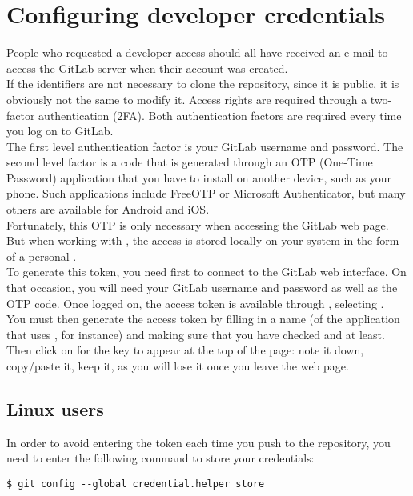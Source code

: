 \section{Configuring developer credentials}
People who requested a developer access should all have received an e-mail to
access the GitLab server when their account was created.\\

If the identifiers are not necessary to clone the repository, since it is
public, it is obviously not the same to modify it. Access rights are required
through a two-factor authentication (2FA). Both authentication factors are
required every time you log on to GitLab.\\

The first level authentication factor is your GitLab username and password. The
second level factor is a code that is generated through an OTP (One-Time
Password) application that you have to install on another device, such as your
phone. Such applications include FreeOTP or Microsoft Authenticator, but many
others are available for Android and iOS.\\

Fortunately, this OTP is only necessary when accessing the GitLab web page. But
when working with , the access is stored locally on your system in
the form of a personal .\\

To generate this token, you need first to connect to the GitLab web interface.
On that occasion, you will need your GitLab username and password as well as
the OTP code. Once logged on, the access token is available through
, selecting .\\

You must then generate the access token by filling in a name (of the
application that uses , for instance) and making sure that you have
checked  and  at
least.\\

Then click on  for the key to appear at
the top of the page: note it down, copy/paste it, keep it, as you will lose it
once you leave the web page.

\subsection{Linux users}
In order to avoid entering the token each time you push to the repository, you
need to enter the following command to store your credentials:
\begin{small}
\begin{lstlisting}
$ git config --global credential.helper store
\end{lstlisting}
\end{small}

